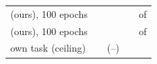 {\begin{tabular}{lrrrr}
    \recog{} (ours), 100 epochs & \AudFullOursRidgeLearned{} & \AudFullOursRidgeAP{} & \AudFullOursRidgeFT{} & \AudFullOursRidgeChanged{} of \AudFullCompared{} \\
    \handicap{} (ours), 100 epochs & \AudFullOursHandicapLearned{} & \AudFullOursHandicapAP{} & \AudFullOursHandicapFT{} & \AudFullOursHandicapChanged{} of \AudFullCompared{} \\
    own task (ceiling) & \AudSeedsOwnLearned{} & \AudSeedsOwnAP{} {\scriptsize (\AudSeedsOwnAPLow{}--\AudSeedsOwnAPHigh{})} & \AudSeedsOwnFT{} & \AudSeedsOwnChanged{} \\
    \bottomrule
\end{tabular}}
